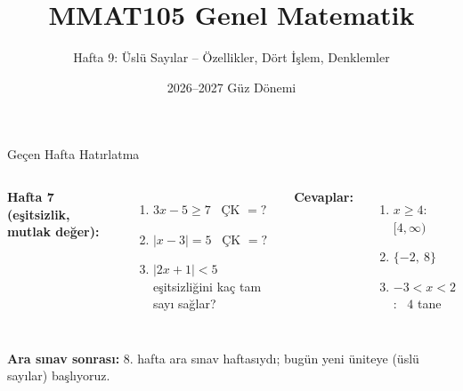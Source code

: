 \documentclass[aspectratio=169,11pt,handout]{beamer}
\title[MMAT105 -- Hafta 9]{MMAT105 Genel Matematik}
\subtitle{Hafta 9: Üslü Sayılar -- Özellikler, Dört İşlem, Denklemler}
\author{}
\date{2026--2027 Güz Dönemi}
\begin{document}
\begin{frame}
\titlepage
\end{frame}


\begin{frame}{Geçen Hafta Hatırlatma}
\begin{columns}[t]
\textbf{Hafta 7 (eşitsizlik, mutlak değer):}
\begin{enumerate}
\item \(3x-5\ge 7\) \ ÇK \(=?\)
\item \(|x-3|=5\) \ ÇK \(=?\)
\item \(|2x+1|<5\) eşitsizliğini kaç tam sayı sağlar?
\end{enumerate}
\pause
\textbf{Cevaplar:}
\begin{enumerate}
\item \(x\ge 4\): \ \([4,\infty)\)
\item \(\{-2,\ 8\}\)
\item \(-3<x<2\): \ \(4\) tane
\end{enumerate}
\end{columns}
\vspace{8pt}
{\footnotesize \textbf{Ara sınav sonrası:} 8. hafta ara sınav haftasıydı; bugün yeni üniteye (üslü sayılar) başlıyoruz.}
\end{frame}
\end{document}
